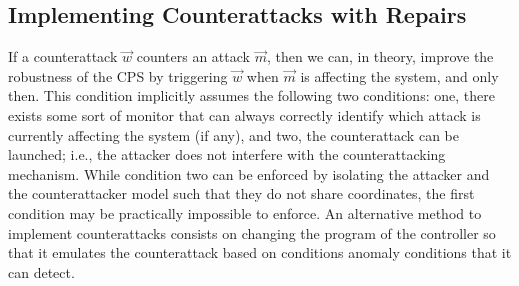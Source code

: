 {\subsection{Implementing Counterattacks with Repairs}
\label{sec:UrgentAttacker}
If a counterattack $\vec{w}$ counters an attack $\vec{m}$, then we can, in theory, improve the robustness of the CPS by triggering $\vec{w}$ when $\vec{m}$ is affecting the system, and only then. This condition implicitly assumes the following two conditions: one, there exists some sort of monitor that can always correctly identify which attack is currently affecting the system (if any), and two, the counterattack can be launched; i.e., the attacker does not interfere with the counterattacking mechanism. While condition two can be enforced by isolating the attacker and the counterattacker model such that they do not share coordinates, the first condition may be practically impossible to enforce. An alternative method to implement counterattacks consists on changing the program of the controller so that it emulates the counterattack based on conditions anomaly conditions that it can detect. 

}
